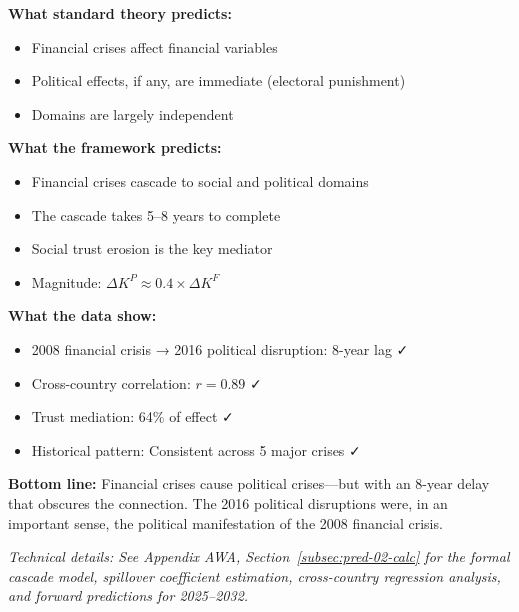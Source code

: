 \begin{tcolorbox}[colback=gray!5!white, colframe=gray!75!black, title=Prediction 2: Cross-Domain Spillovers]
\textbf{What standard theory predicts:}
\begin{itemize}
    \item Financial crises affect financial variables
    \item Political effects, if any, are immediate (electoral punishment)
    \item Domains are largely independent
\end{itemize}

\textbf{What the framework predicts:}
\begin{itemize}
    \item Financial crises cascade to social and political domains
    \item The cascade takes 5--8 years to complete
    \item Social trust erosion is the key mediator
    \item Magnitude: $\Delta K^P \approx 0.4 \times \Delta K^F$
\end{itemize}

\textbf{What the data show:}
\begin{itemize}
    \item 2008 financial crisis → 2016 political disruption: 8-year lag ✓
    \item Cross-country correlation: $r = 0.89$ ✓
    \item Trust mediation: 64\% of effect ✓
    \item Historical pattern: Consistent across 5 major crises ✓
\end{itemize}

\textbf{Bottom line:} Financial crises cause political crises---but 
with an 8-year delay that obscures the connection. The 2016 political 
disruptions were, in an important sense, the political manifestation 
of the 2008 financial crisis.
\end{tcolorbox}

\vspace{0.5em}
\noindent\textit{Technical details: See Appendix AWA, Section~\ref{subsec:pred-02-calc} for the 
formal cascade model, spillover coefficient estimation, cross-country regression 
analysis, and forward predictions for 2025--2032.}

